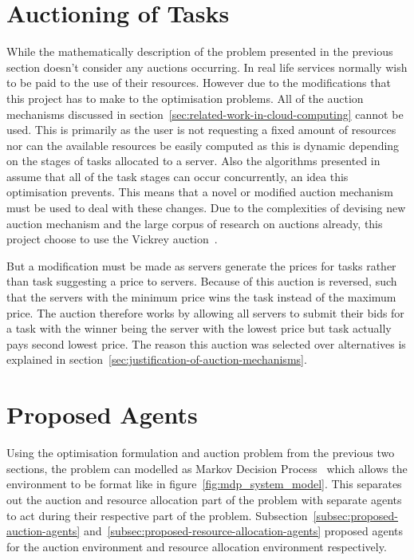 \section{Auctioning of Tasks}\label{sec:auctioning-of-tasks}
While the mathematically description of the problem presented in the previous section doesn't consider any auctions
occurring. In real
life services normally wish to be paid to the use of their resources. However due to the modifications that
this project has to make to the optimisation problems. All of the auction mechanisms discussed in section~\ref{sec:related-work-in-cloud-computing} cannot
be used. This is primarily as the user is not requesting a fixed amount of resources nor can the available resources be easily computed
as this is dynamic depending on the stages of tasks allocated to a server. Also the algorithms presented in ~\cite{FlexibleResourceAllocation}
assume that all of the task stages can occur concurrently, an idea this optimisation prevents. This means that a novel or modified auction
mechanism must be used to deal with these changes. Due to the complexities of devising new auction mechanism and the
large corpus of research on auctions already, this project choose to use the Vickrey auction~\citep{vickrey}.

But a modification must be made as servers generate the prices for tasks rather than task suggesting a price to servers.
Because of this auction is reversed, such that the servers with the minimum price wins the task instead of the maximum
price. The auction therefore works by allowing all servers to submit their bids for a task with the winner being the
server with the lowest price but task actually pays second lowest price. The reason this auction was selected over
alternatives is explained in section~\ref{sec:justification-of-auction-mechanisms}.

\section{Proposed Agents}\label{sec:proposed-agents}
Using the optimisation formulation and auction problem from the previous two sections, the problem can modelled as
Markov Decision Process~\cite{Bel} which allows the environment to be format like in figure~\ref{fig:mdp_system_model}.
This separates out the auction and resource allocation part of the problem with separate agents to act during their
respective part of the problem. Subsection~\ref{subsec:proposed-auction-agents}
and~\ref{subsec:proposed-resource-allocation-agents} proposed agents for the auction environment and resource allocation
environment respectively.

